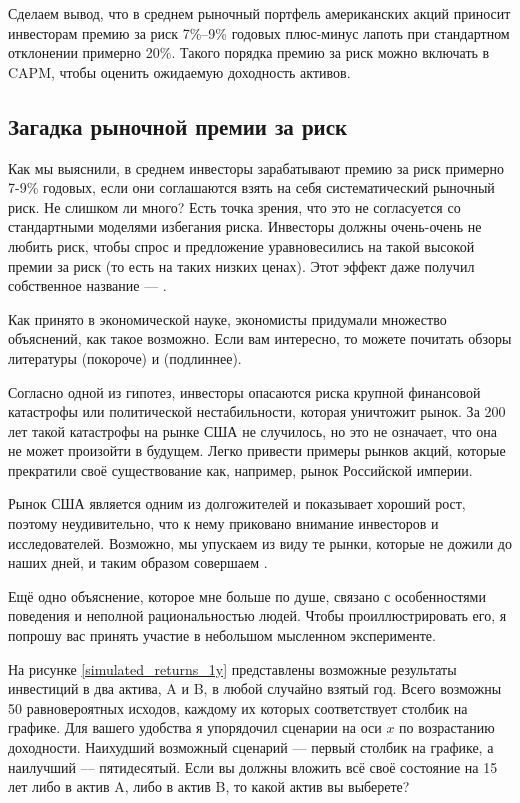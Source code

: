 Сделаем вывод, что в среднем рыночный портфель американских акций приносит 
инвесторам премию за риск 7\%--9\% годовых плюс-минус лапоть при стандартном 
отклонении примерно 20\%. Такого порядка премию за риск можно включать в CAPM, 
чтобы оценить ожидаемую доходность активов.

\subsection{Загадка рыночной премии за риск}

Как мы выяснили, в среднем инвесторы зарабатывают премию за риск примерно 7-9\%  
годовых, если они соглашаются взять на себя систематический рыночный риск. Не 
слишком ли много? Есть точка зрения, что это не согласуется со стандартными 
моделями избегания риска. Инвесторы должны очень-очень не любить риск, чтобы 
спрос и предложение уравновесились на такой высокой премии за риск (то есть на 
таких низких ценах). Этот эффект даже получил собственное название --- 
.

Как принято в экономической науке, экономисты придумали множество объяснений, 
как такое возможно. Если вам интересно, то можете почитать обзоры литературы 
\cite{siegel1997anomalies} (покороче) и \cite{mehra2007equity} (подлиннее).

Согласно одной из гипотез, инвесторы опасаются риска крупной финансовой 
катастрофы или политической нестабильности, которая уничтожит рынок. За 200 лет 
такой катастрофы на рынке США не случилось, но это не означает, что она не может 
произойти в будущем. Легко привести примеры рынков акций, которые прекратили 
своё существование как, например, рынок Российской империи.

Рынок США является одним из долгожителей и показывает хороший рост, поэтому 
неудивительно, что к нему приковано внимание инвесторов и исследователей. 
Возможно, мы упускаем из виду те рынки, которые не дожили до наших дней, и таким 
образом совершаем .

Ещё одно объяснение, которое мне больше по душе, связано с особенностями 
поведения и неполной рациональностью людей. Чтобы проиллюстрировать его, я 
попрошу вас принять участие в небольшом мысленном эксперименте.

На рисунке \ref{simulated_returns_1y} представлены возможные результаты
инвестиций в два актива, A и B, в любой случайно взятый год. Всего возможны 50
равновероятных исходов, каждому их которых соответствует столбик на графике. Для
вашего удобства я упорядочил сценарии на оси $x$ по возрастанию доходности.
Наихудший возможный сценарий --- первый столбик на графике, а наилучший ---
пятидесятый. Если вы должны вложить всё своё состояние на 15 лет либо в актив A,
либо в актив B, то какой актив вы выберете?

